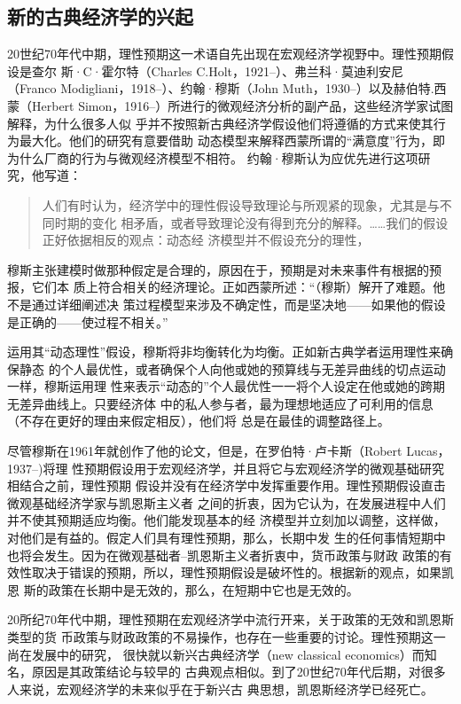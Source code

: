 \subsection{新的古典经济学的兴起}

20世纪70年代中期，理性预期这一术语自先出现在宏观经济学视野中。理性预期假设是查尔
斯·C·霍尔特（Charles C.Holt，1921--）、弗兰科·莫迪利安尼 （Franco
Modigliani，1918--）、约翰·穆斯（John Muth，1930--）以及赫伯特.西蒙（Herbert
Simon，1916--）所进行的微观经济分析的副产品，这些经济学家试图解释，为什么很多人似
乎并不按照新古典经济学假设他们将遵循的方式来使其行为最大化。他们的研究有意要借助
动态模型来解释西蒙所谓的“满意度”行为，即为什么厂商的行为与微观经济模型不相符。
约翰·穆斯认为应优先进行这项研究，他写道：

\begin{quotation}
  人们有时认为，经济学中的理性假设导致理论与所观紧的现象，尤其是与不同时期的变化
  相矛盾，或者导致理论没有得到充分的解释。……我们的假设正好依据相反的观点：动态经
  济模型并不假设充分的理性，
\end{quotation}

穆斯主张建模时做那种假定是合理的，原因在于，预期是对未来事件有根据的预报，它们本
质上符合相关的经济理论。正如西蒙所述：“（穆斯）解开了难题。他不是通过详细阐述决
策过程模型来涉及不确定性，而是坚决地——如果他的假设是正确的——使过程不相关。”

运用其“动态理性”假设，穆斯将非均衡转化为均衡。正如新古典学者运用理性来确保静态
的个人最优性，或者确保个人向他或她的预算线与无差异曲线的切点运动一样，穆斯运用理
性来表示“动态的”个人最优性一一将个人设定在他或她的跨期无差异曲线上。只要经济体
中的私人参与者，最为理想地适应了可利用的信息（不存在更好的理由来假定相反），他们将
总是在最佳的调整路径上。

尽管穆斯在1961年就创作了他的论文，但是，在罗伯特·卢卡斯（Robert Lucas，1937--)将理
性预期假设用于宏观经济学，并且将它与宏观经济学的微观基础研究相结合之前，理性预期
假设并没有在经济学中发挥重要作用。理性预期假设直击微观基础经济学家与凯恩斯主义者
之间的折衷，因为它认为，在发展进程中人们并不使其预期适应均衡。他们能发现基本的经
济模型并立刻加以调整，这样做，对他们是有益的。假定人们具有理性预期，那么，长期中发
生的任何事情短期中也将会发生。因为在微观基础者--凯恩斯主义者折衷中，货币政策与财政
政策的有效性取决于错误的预期，所以，理性预期假设是破坏性的。根据新的观点，如果凯恩
斯的政策在长期中是无效的，那么，在短期中它也是无效的。

20所纪70年代中期，理性预期在宏观经济学中流行开来，关于政策的无效和凯恩斯类型的货
币政策与财政政策的不易操作，也存在一些重要的讨论。理性预期这一尚在发展中的研究，
很快就以新兴古典经济学（new classical economics）而知名，原因是其政策结论与较早的
古典观点相似。到了20世纪70年代后期，对很多人来说，宏观经济学的未来似乎在于新兴古
典思想，凯恩斯经济学已经死亡。

